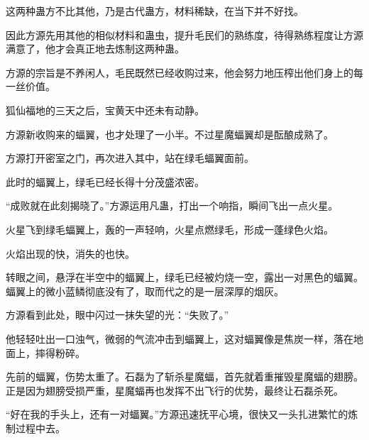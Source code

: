 \begin{this_body}
这两种蛊方不比其他，乃是古代蛊方，材料稀缺，在当下并不好找。

因此方源先用其他的相似材料和蛊虫，提升毛民们的熟练度，待得熟练程度让方源满意了，他才会真正地去炼制这两种蛊。

方源的宗旨是不养闲人，毛民既然已经收购过来，他会努力地压榨出他们身上的每一丝价值。

狐仙福地的三天之后，宝黄天中还未有动静。

方源新收购来的蝠翼，也才处理了一小半。不过星魔蝠翼却是酝酿成熟了。

方源打开密室之门，再次进入其中，站在绿毛蝠翼面前。

此时的蝠翼上，绿毛已经长得十分茂盛浓密。

“成败就在此刻揭晓了。”方源运用凡蛊，打出一个响指，瞬间飞出一点火星。

火星飞到绿毛蝠翼上，轰的一声轻响，火星点燃绿毛，形成一蓬绿色火焰。

火焰出现的快，消失的也快。

转眼之间，悬浮在半空中的蝠翼上，绿毛已经被灼烧一空，露出一对黑色的蝠翼。蝠翼上的微小蓝鳞彻底没有了，取而代之的是一层深厚的烟灰。

方源看到此处，眼中闪过一抹失望的光：“失败了。”

他轻轻吐出一口浊气，微弱的气流冲击到蝠翼上，这对蝠翼像是焦炭一样，落在地面上，摔得粉碎。

先前的蝠翼，伤势太重了。石磊为了斩杀星魔蝠，首先就着重摧毁星魔蝠的翅膀。正是因为翅膀受损严重，星魔蝠再也发挥不出飞行的优势，最终让石磊杀死。

“好在我的手头上，还有一对蝠翼。”方源迅速抚平心境，很快又一头扎进繁忙的炼制过程中去。

\end{this_body}

